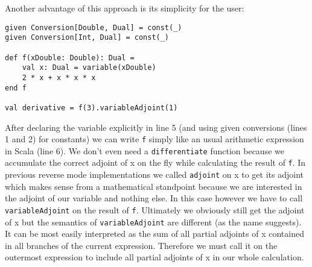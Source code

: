 Another advantage of this approach is its simplicity for the user:
\begin{lstlisting}
given Conversion[Double, Dual] = const(_)
given Conversion[Int, Dual] = const(_)

def f(xDouble: Double): Dual =
    val x: Dual = variable(xDouble)
    2 * x + x * x * x
end f

val derivative = f(3).variableAdjoint(1)
\end{lstlisting}
After declaring the variable explicitly in line 5 (and using given conversions (lines 1 and 2) for constants) we can write \lstinline{f} simply like an usual arithmetic expression in Scala (line 6). We don't even need a \lstinline{differentiate} function because we accumulate the correct adjoint of x on the fly while calculating the result of \lstinline{f}. In previous reverse mode implementations we called \lstinline{adjoint} on x to get its adjoint which makes sense from a mathematical standpoint because we are interested in the adjoint of our variable and nothing else. In this case however we have to call \lstinline{variableAdjoint} on the result of \lstinline{f}. Ultimately we obviously still get the adjoint of x but the semantics of \lstinline{variableAdjoint} are different (as the name suggests). It can be most easily interpreted as the sum of all partial adjoints of x contained in all branches of the current expression. Therefore we must call it on the outermost expression to include all partial adjoints of x in our whole calculation.